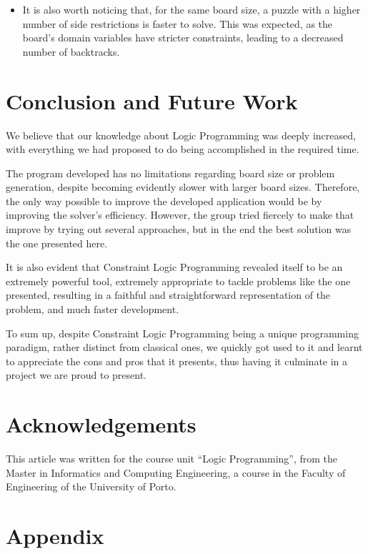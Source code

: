 \documentclass{llncs}
\begin{document}
\begin{itemize}
	\item It is also worth noticing that, for the same board size, a puzzle with a higher number of side restrictions is faster to solve. This was expected, as the board's domain variables have stricter constraints, leading to a decreased number of backtracks.
\end{itemize}

%
\section{Conclusion and Future Work}

We believe that our knowledge about Logic Programming was deeply increased, with everything we had proposed to do being accomplished in the required time.

The program developed has no limitations regarding board size or problem generation, despite becoming evidently slower with larger board sizes. Therefore, the only way possible to improve the developed application would be by improving the solver's efficiency. However, the group tried fiercely to make that improve by trying out several approaches, but in the end the best solution was the one presented here.

It is also evident that Constraint Logic Programming revealed itself to be an extremely powerful tool, extremely appropriate to tackle problems like the one presented, resulting in a faithful and straightforward representation of the problem, and much faster development.

To sum up, despite Constraint Logic Programming being a unique programming paradigm, rather distinct from classical ones, we quickly got used to it and learnt to appreciate the cons and pros that it presents, thus having it culminate in a project we are proud to present.

%
\section{Acknowledgements}
This article was written for the course unit ``Logic Programming'', from the Master in Informatics and Computing Engineering, a course in the Faculty of Engineering of the University of Porto.


%
%
\clearpage
{}
\renewcommand\refname{References}




\newpage
\appendix
\section{Appendix}
\end{document}
